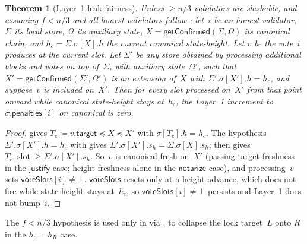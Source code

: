 \documentclass{article}
\newcommand{\slot}[0]{\ensuremath{\operatorname{\mathrm{slot}}}}
\newcommand{\target}{\mathsf{target}}
\newcommand{\just}{\ensuremath{\mathsf{justify}}\xspace}
\newcommand{\notar}{\ensuremath{\mathsf{notarize}}\xspace}
\newcommand{\voteSlots}{\mathsf{voteSlots}}
\newcommand{\penalties}{\mathsf{penalties}}
\newcommand{\getConfirmed}{\textsf{getConfirmed}\xspace}
\theoremstyle{plain}
\newtheorem{theorem}{Theorem}
\theoremstyle{definition}
\theoremstyle{remark}
\begin{document}
\begin{theorem}[Layer~1 leak fairness]\label{thm:fairness}
Unless $\geq n/3$ validators are slashable, and assuming $f < n/3$ and all honest validators follow : let~$i$ be an honest validator, $\Sigma$ its local store, $\Omega$ its auxiliary state, $X = \getConfirmed(\Sigma, \Omega)$ its canonical chain, and $h_c = \Sigma.\sigma[X].h$ the current canonical state-height.
Let $v$ be the vote~$i$ produces at the current slot.
Let $\Sigma'$ be any store obtained by processing additional blocks and votes on top of~$\Sigma$, with auxiliary state~$\Omega'$, such that $X' = \getConfirmed(\Sigma', \Omega')$ is an extension of~$X$ with $\Sigma'.\sigma[X'].h = h_c$, and suppose~$v$ is included on~$X'$.
Then for every slot processed on~$X'$ from that point onward while canonical state-height stays at~$h_c$, the Layer~1 increment to $\sigma.\penalties[i]$ on canonical is zero.
\end{theorem}

\begin{proof}
 gives $T_c \coloneqq v.\target \preceq X \preceq X'$ with $\sigma[T_c].h = h_c$.
The hypothesis $\Sigma'.\sigma[X'].h = h_c$ with  gives $\Sigma'.\sigma[X'].s_h = \Sigma.\sigma[X].s_h$;  then gives $T_c.\slot \geq \Sigma'.\sigma[X'].s_h$.
So~$v$ is canonical-fresh on~$X'$ (passing target freshness in the \just case; height freshness alone in the \notar case), and processing~$v$ sets $\voteSlots[i] \neq \bot$.
$\voteSlots$ resets only at a height advance, which does not fire while state-height stays at~$h_c$, so $\voteSlots[i] \neq \bot$ persists and Layer~1 does not bump~$i$.
\end{proof}

The $f < n/3$ hypothesis is used only in  via , to collapse the lock target~$L$ onto $R$ in the $h_c = h_R$ case.
\end{document}

